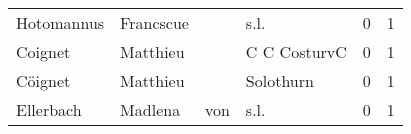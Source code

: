 \begin{center}
\begin{tiny}
\begin{longtabu}{llllrr}
               Hotomannus &                          Francscue &             &                                        s.l. &          0 &         1 \\
                  Coignet &                           Matthieu &             &                                C C CosturvC &          0 &         1 \\
                  Cöignet &                           Matthieu &             &                                   Solothurn &          0 &         1 \\
                Ellerbach &                            Madlena &         von &                                        s.l. &          0 &         1 \\
\bottomrule

\end{longtabu}




\end{tiny}

\end{center}


